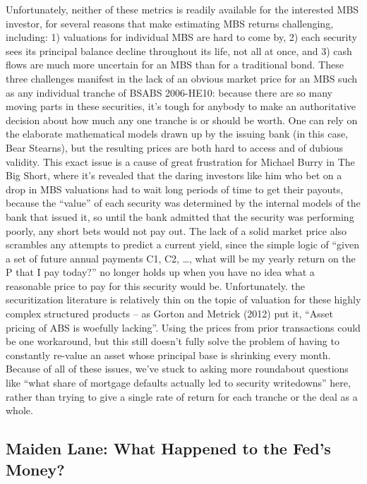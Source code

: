 \documentclass[12pt]{article}
\begin{document}
	Unfortunately, neither of these metrics is readily available for the interested MBS investor, for several reasons that make estimating MBS returns challenging, including: 1) valuations for individual MBS are hard to come by, 2) each security sees its principal balance decline throughout its life, not all at once, and 3) cash flows are much more uncertain for an MBS than for a traditional bond. These three challenges manifest in the lack of an obvious market price for an MBS such as any individual tranche of BSABS 2006-HE10: because there are so many moving parts in these securities, it’s tough for anybody to make an authoritative decision about how much any one tranche is or should be worth. One can rely on the elaborate mathematical models drawn up by the issuing bank (in this case, Bear Stearns), but the resulting prices are both hard to access and of dubious validity. This exact issue is a cause of great frustration for Michael Burry in The Big Short, where it’s revealed that the daring investors like him who bet on a drop in MBS valuations had to wait long periods of time to get their payouts, because the “value” of each security was determined by the internal models of the bank that issued it, so until the bank admitted that the security was performing poorly, any short bets would not pay out. The lack of a solid market price also scrambles any attempts to predict a current yield, since the simple logic of “given a set of future annual payments C1, C2, …, what will be my yearly return on the P that I pay today?” no longer holds up when you have no idea what a reasonable price to pay for this security would be. Unfortunately. the securitization literature is relatively thin on the topic of valuation for these highly complex structured products – as Gorton and Metrick (2012) put it, “Asset pricing of ABS is woefully lacking”. Using the prices from prior transactions could be one workaround, but this still doesn’t fully solve the problem of having to constantly re-value an asset whose principal base is shrinking every month. Because of all of these issues, we’ve stuck to asking more roundabout questions like “what share of mortgage defaults actually led to security writedowns” here, rather than trying to give a single rate of return for each tranche or the deal as a whole.


\subsection*{Maiden Lane: What Happened to the Fed's Money?}
\end{document}
